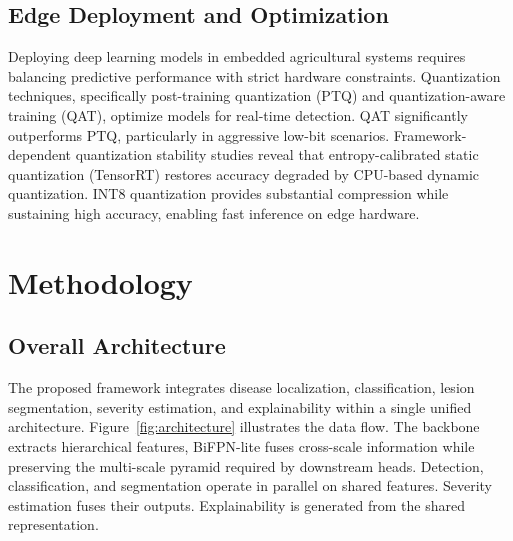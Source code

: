 \documentclass[10pt,a4paper,twocolumn]{article}
\begin{document}
\subsection{Edge Deployment and Optimization}

Deploying deep learning models in embedded agricultural systems requires balancing predictive performance with strict hardware constraints. Quantization techniques, specifically post-training quantization (PTQ) and quantization-aware training (QAT), optimize models for real-time detection. \cite{freitas2025optimising} QAT significantly outperforms PTQ, particularly in aggressive low-bit scenarios. Framework-dependent quantization stability studies reveal that entropy-calibrated static quantization (TensorRT) restores accuracy degraded by CPU-based dynamic quantization. INT8 quantization provides substantial compression while sustaining high accuracy, enabling fast inference on edge hardware.

\section{Methodology}
\label{sec:method}

\subsection{Overall Architecture}

The proposed framework integrates disease localization, classification, lesion segmentation, severity estimation, and explainability within a single unified architecture. Figure~\ref{fig:architecture} illustrates the data flow. The backbone extracts hierarchical features, BiFPN-lite fuses cross-scale information while preserving the multi-scale pyramid required by downstream heads. Detection, classification, and segmentation operate in parallel on shared features. Severity estimation fuses their outputs. Explainability is generated from the shared representation.
\end{document}
